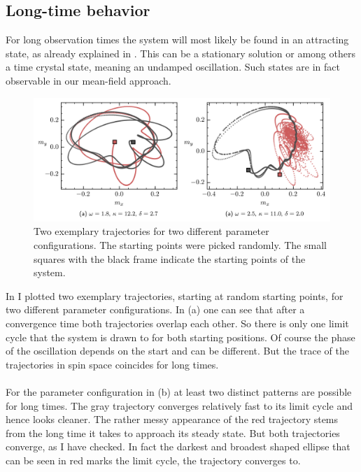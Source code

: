 \subsection{Long-time behavior}
For long observation times the system will most likely be found in an attracting state, as already explained in . This can be a stationary solution or among others a time crystal state, meaning an undamped oscillation. Such states are in fact observable in our mean-field approach. 
\begin{figure}[H]
    \hspace*{-1.2cm}
    \includegraphics[scale=1]{pictures/lc_example.png}
    \caption{Two exemplary trajectories for two different parameter configurations. The starting points were picked randomly. The small squares with the black frame indicate the starting points of the system.}
    \label{fig:expl_lc}
\end{figure}
In  I plotted two exemplary trajectories, starting at random starting points, for two different parameter configurations. In  (a) one can see that after a convergence time both trajectories overlap each other. So there is only one limit cycle that the system is drawn to for both starting positions. Of course the phase of the oscillation depends on the start and can be different. But the trace of the trajectories in spin space coincides for long times. \\\\For the parameter configuration in  (b) at least two distinct patterns are possible for long times. The gray trajectory converges relatively fast to its limit cycle and hence looks cleaner. The rather messy appearance of the red trajectory stems from the long time it takes to approach its steady state. But both trajectories converge, as I have checked. In fact the darkest and broadest shaped ellipse that can be seen in red marks the limit cycle, the trajectory converges to.\\\\
